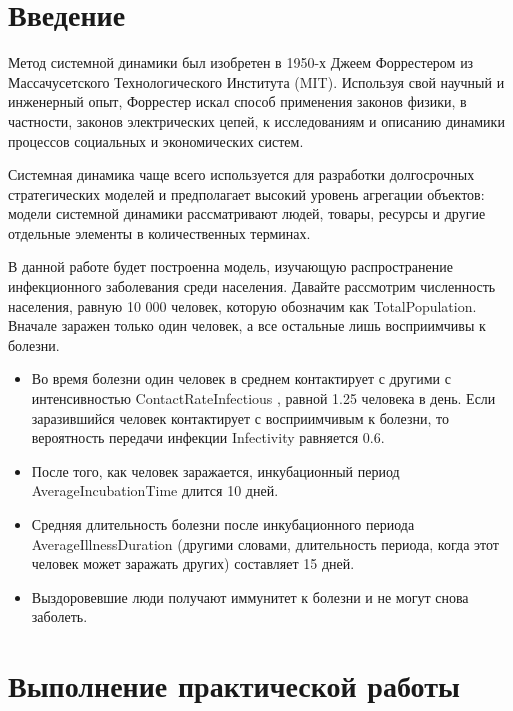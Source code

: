 \graphicspath{{./img/}} %

\section*{\LARGE Введение}
Метод системной динамики был изобретен в 1950-х Джеем Форрестером из
Массачусетского Технологического Института (MIT). Используя свой научный и
инженерный опыт, Форрестер искал способ применения законов физики, в
частности, законов электрических цепей, к исследованиям и описанию динамики
процессов социальных и экономических систем.\par
Системная динамика чаще всего используется для разработки долгосрочных
стратегических моделей и предполагает высокий уровень агрегации объектов:
модели системной динамики рассматривают людей, товары, ресурсы и другие
отдельные элементы в количественных терминах.\par
В данной работе будет построенна модель, изучающую распространение
инфекционного заболевания среди населения. Давайте рассмотрим численность
населения, равную 10 000 человек, которую обозначим как TotalPopulation.
Вначале заражен только один человек, а все остальные лишь восприимчивы
к болезни.

\begin{itemize}
	\item Во время болезни один человек в среднем контактирует с другими с
		интенсивностью ContactRateInfectious , равной 1.25 человека в день.
		Если заразившийся человек контактирует с восприимчивым к болезни,
		то вероятность передачи инфекции Infectivity равняется 0.6.
	\item После того, как человек заражается, инкубационный период
		AverageIncubationTime длится 10 дней.
	\item Средняя длительность болезни после инкубационного периода
		AverageIllnessDuration (другими словами, длительность периода, когда
		этот человек может заражать других) составляет 15 дней.
	\item Выздоровевшие люди получают иммунитет к болезни и не могут снова
		заболеть.
\end{itemize}


\clearpage

\section*{\LARGE Выполнение практической работы}

